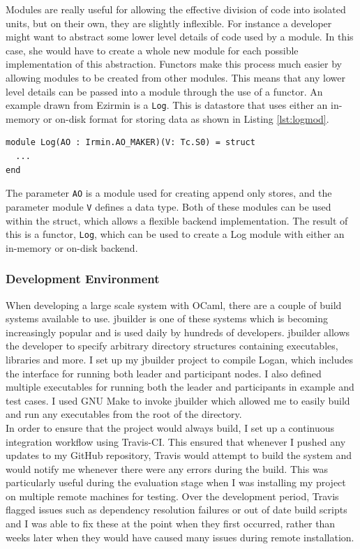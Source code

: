 \documentclass[12pt,a4paper,twoside,openright]{report}
\begin{document}
	Modules are really useful for allowing the effective division of code into isolated units, but on their own, they are slightly inflexible. 
	For instance a developer might want to abstract some lower level details of code used by a module.
	In this case, she would have to create a whole new module for each possible implementation of this abstraction.
	Functors make this process much easier by allowing modules to be created from other modules. 
	This means that any lower level details can be passed into a module through the use of a functor.
	An example drawn from Ezirmin is a \texttt{Log}. 
	This is datastore that uses either an in-memory or on-disk format for storing data as shown in Listing \ref{lst:logmod}.\\
	\begin{lstlisting}[caption={Ezirmin Log Module},label={lst:logmod},float,floatplacement=H]
module Log(AO : Irmin.AO_MAKER)(V: Tc.S0) = struct
  ...
end
	\end{lstlisting}
	\noindent The parameter \texttt{AO} is a module used for creating append only stores, and the parameter module \texttt{V} defines a data type.
	Both of these modules can be used within the struct, which allows a flexible backend implementation.
	The result of this is a functor, \texttt{Log}, which can be used to create a Log module with either an in-memory or on-disk backend.

	\subsubsection*{Development Environment}
	When developing a large scale system with OCaml, there are a couple of build systems available to use. 
	jbuilder \parencite{jbuilder} is one of these systems which is becoming increasingly popular and is used daily by hundreds of developers.
	jbuilder allows the developer to specify arbitrary directory structures containing executables, libraries and more.
	I set up my jbuilder project to compile Logan, which includes the interface for running both leader and participant nodes. 
	I also defined multiple executables for running both the leader and participants in example and test cases. 
	I used GNU Make \parencite{GNUMake} to invoke jbuilder which allowed me to easily build and run any executables from the root of the directory.\\
	
	In order to ensure that the project would always build, I set up a continuous integration workflow using Travis-CI. 
	This ensured that whenever I pushed any updates to my GitHub repository, Travis would attempt to build the system and would notify me whenever there were any errors during the build.
	This was particularly useful during the evaluation stage when I was installing my project on multiple remote machines for testing.
	Over the development period, Travis flagged issues such as dependency resolution failures or out of date build scripts and I was able to fix these at the point when they first occurred, rather than weeks later when they would have caused many issues during remote installation.
\end{document}
